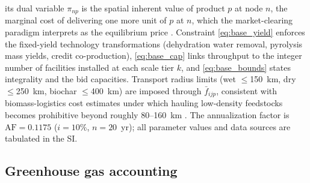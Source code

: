 its dual variable $\pi_{np}$ is the spatial inherent value of product $p$ at
node $n$, the marginal cost of delivering one more unit of $p$ at $n$, which
the market-clearing paradigm interprets as the equilibrium price
\cite{sampat2019,ma2023}. Constraint \eqref{eq:base_yield} enforces the
fixed-yield technology transformations (dehydration water removal, pyrolysis
mass yields, credit co-production), \eqref{eq:base_cap} links throughput to the
integer number of facilities installed at each scale tier $k$, and
\eqref{eq:base_bounds} states integrality and the bid capacities. Transport
radius limits (wet $\leq$150~km, dry $\leq$250~km, biochar $\leq$400~km) are
imposed through $\bar{f}_{ijp}$, consistent with biomass-logistics cost
estimates under which hauling low-density feedstocks becomes prohibitive
beyond roughly 80--160~km \cite{searcy2007}. The annualization factor is
$\mathrm{AF}=0.1175$ ($i{=}10\%$, $n{=}20$~yr); all parameter values and data
sources are tabulated in the SI.

\subsection{Greenhouse gas accounting}

